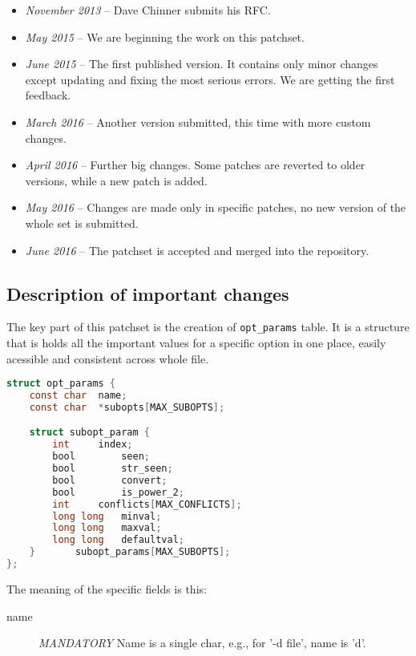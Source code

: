 \begin{desciption}
\begin{itemize}
	\item {\em November 2013} -- Dave Chinner submits his RFC.
	\item {\em May 2015} -- We are beginning the work on this patchset.
	\item {\em June 2015} -- The first published version. It contains
		only minor changes except updating and fixing the most
		serious errors. We are getting the first feedback.
	\item {\em March 2016} -- Another version submitted, this time with
		more custom changes.
	\item {\em April 2016} -- Further big changes. Some patches are
		reverted to older versions, while a new patch is added.
	\item {\em May 2016} -- Changes are made only in specific patches,
		no new version of the whole set is submitted.
	\item {\em June 2016} -- The patchset is accepted and merged into
		the repository.
\end{itemize}

\subsection{Description of important changes}

The key part of this patchset is the creation of {\tt opt\_params} table.
It is a structure that is holds all the important values for a specific
option in one place, easily acessible and consistent across whole file.

\begin{lstlisting}[frame=none, basicstyle=\footnotesize\ttfamily,
language=C, numbers=none, numberstyle=\tiny\color{black},
caption= {Definition of the table.}]
struct opt_params {
	const char	name;
	const char	*subopts[MAX_SUBOPTS];

	struct subopt_param {
		int		index;
		bool		seen;
		bool		str_seen;
		bool		convert;
		bool		is_power_2;
		int		conflicts[MAX_CONFLICTS];
		long long	minval;
		long long	maxval;
		long long	defaultval;
	}		subopt_params[MAX_SUBOPTS];
};
\end{lstlisting}

The meaning of the specific fields is this:
\begin{description}
\item[name] {\em MANDATORY}
  Name is a single char, e.g., for '-d file', name is 'd'.


\end{description}
\end{desciption}

